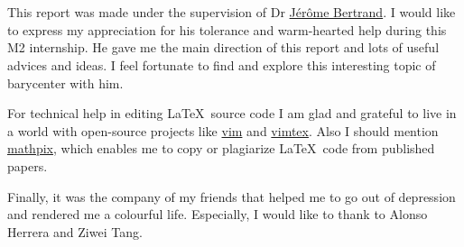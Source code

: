 \section*{}

This report was made under the supervision of Dr \href{https://www.math.univ-toulouse.fr/~bertrand/}{Jérôme Bertrand}.
I would like to express my appreciation for his tolerance and warm-hearted help during this M2 internship.
He gave me the main direction of this report and lots of useful advices and ideas.
I feel fortunate to find and explore this interesting topic of barycenter with him.

For technical help in editing \LaTeX\, source code I am glad and grateful to live in a world with open-source projects like \href{https://www.vim.org/}{vim} and \href{https://github.com/lervag/vimtex}{vimtex}.
Also I should mention \href{https://mathpix.com/}{mathpix}, which enables me to copy or plagiarize \LaTeX\, code from published papers.

Finally, it was the company of my friends that helped me to go out of depression and rendered me a colourful life.
Especially, I would like to thank to Alonso Herrera and Ziwei Tang.
